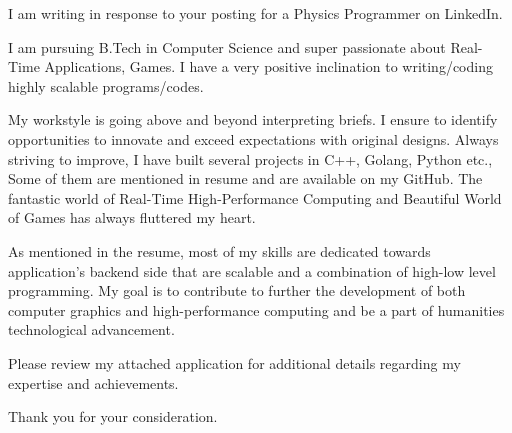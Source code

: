 I am writing in response to your posting for a Physics Programmer on LinkedIn.

I am pursuing B.Tech in Computer Science and super passionate about Real-Time Applications, Games. I have a very positive inclination to writing/coding highly scalable programs/codes.

My workstyle is going above and beyond interpreting briefs. I ensure to identify opportunities to innovate and exceed expectations with original designs. Always striving to improve, I have built several projects in C++, Golang, Python etc., Some of them are mentioned in resume and are available on my GitHub. The fantastic world of Real-Time High-Performance Computing and Beautiful World of Games has always fluttered my heart. 

As mentioned in the resume, most of my skills are dedicated towards application's backend side that are scalable and a combination of high-low level programming. My goal is to contribute to further the development of both computer graphics and high-performance computing and be a part of humanities technological advancement.

Please review my attached application for additional details regarding my expertise and achievements.

Thank you for your consideration.